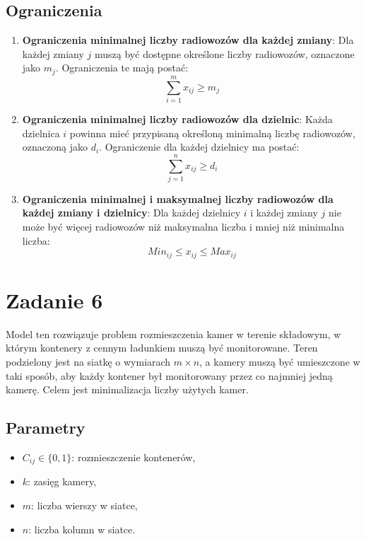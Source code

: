 \documentclass[12pt, letterpaper]{article}
\begin{document}
\subsection{Ograniczenia}
\begin{enumerate}
  \item \textbf{Ograniczenia minimalnej liczby radiowozów dla każdej zmiany}:
        Dla każdej zmiany \( j \) muszą być dostępne określone liczby
        radiowozów, oznaczone jako \( m_j \). Ograniczenia te mają postać:
        \[
          \sum_{i=1}^{m} x_{ij} \geq m_j
        \]

  \item \textbf{Ograniczenia minimalnej liczby radiowozów dla dzielnic}:
        Każda dzielnica \( i \) powinna mieć przypisaną określoną minimalną
        liczbę radiowozów, oznaczoną jako \( d_i \). Ograniczenie dla każdej
        dzielnicy
        ma postać:
        \[
          \sum_{j=1}^{n} x_{ij} \geq d_i
        \]

  \item \textbf{Ograniczenia minimalnej i maksymalnej liczby radiowozów dla
          każdej zmiany i
          dzielnicy}:
        Dla każdej dzielnicy \( i \) i każdej zmiany \( j \) nie może być
        więcej radiowozów niż maksymalna liczba i mniej niż minimalna liczba:
        \[
          Min_{ij} \leq x_{ij} \leq Max_{ij}
        \]
\end{enumerate}

\section{Zadanie 6}

Model ten rozwiązuje problem rozmieszczenia kamer w terenie składowym, w którym
kontenery z cennym ładunkiem muszą być monitorowane. Teren podzielony jest na
siatkę o wymiarach \( m \times n \), a kamery muszą być umieszczone w taki
sposób, aby każdy kontener był monitorowany przez co najmniej jedną kamerę.
Celem jest minimalizacja liczby użytych kamer.

\subsection{Parametry}
\begin{itemize}
  \item \( C_{ij} \in \{0, 1\} \): rozmieszczenie kontenerów,
  \item \( k \): zasięg kamery,
  \item \( m \): liczba wierszy w siatce,
  \item \( n \): liczba kolumn w siatce.
\end{itemize}
\end{document}

